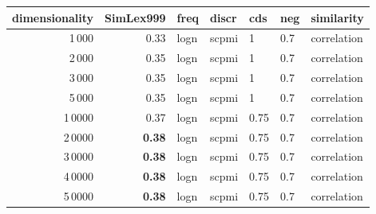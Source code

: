 \begin{tabular}{rrlllll}
\toprule
 dimensionality &  SimLex999 &  freq &  discr &   cds &  neg &   similarity \\
\midrule
           1\,000 &       0.33 &  logn &  scpmi &     1 &  0.7 &  correlation \\
           2\,000 &       0.35 &  logn &  scpmi &     1 &  0.7 &  correlation \\
           3\,000 &       0.35 &  logn &  scpmi &     1 &  0.7 &  correlation \\
           5\,000 &       0.35 &  logn &  scpmi &     1 &  0.7 &  correlation \\
          1\,0000 &       0.37 &  logn &  scpmi &  0.75 &  0.7 &  correlation \\
          2\,0000 &       \textbf{0.38} &  logn &  scpmi &  0.75 &  0.7 &  correlation \\
          3\,0000 &       \textbf{0.38} &  logn &  scpmi &  0.75 &  0.7 &  correlation \\
          4\,0000 &       \textbf{0.38} &  logn &  scpmi &  0.75 &  0.7 &  correlation \\
          5\,0000 &       \textbf{0.38} &  logn &  scpmi &  0.75 &  0.7 &  correlation \\
\bottomrule
\end{tabular}

